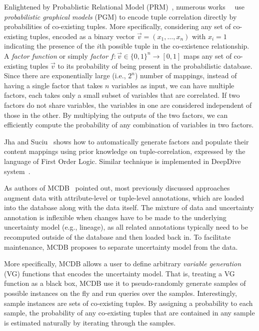 Enlightened by Probablistic Relational Model (PRM)~\cite{friedman1999learning}, numerous works~~\cite{sen2007representing, sen2009prdb} use \emph{probabilistic graphical models} (PGM) to encode tuple correlation directly by probabilities of co-existing tuples.
More specifically, considering any set of co-existing tuples, encoded as a binary vector $\vec v=(x_1,\ldots,x_n)$ with $x_i=1$ indicating the presence of the $i$th possible tuple in the co-existence relationship.
A \emph{factor function} or simply \emph{factor} $f: \vec v\in\{0,1\}^n \to [0,1]$ maps any set of co-existing tuples $\vec v$ to its probability of being present in the probabilistic database. 
Since there are exponentially large (i.e., $2^n$) number of mappings, instead of having a single factor that takes $n$ variables as input, we can have multiple factors, each takes only a small subset of variables that are correlated.
If two factors do not share variables, the variables in one are considered independent of those in the other.
By multiplying the outputs of the two factors, we can efficiently compute the probability of any combination of variables in two factors. 

Jha and Suciu~\cite{jha2012probabilistic} shows how to automatically generate factors and populate their content mappings using prior knowledge on tuple-correlation, expressed by the language of First Order Logic.
Similar technique is implemented in DeepDive system~\cite{shin2015incremental}.

As authors of MCDB~\cite{jampani2008mcdb} pointed out, most previously discussed approaches augment data with attribute-level or tuple-level annotations, which are loaded into the database along with the data itself.
The mixture of data and uncertainty annotation is inflexible when changes have to be made to the underlying uncertainty model (e.g., lineage), as all related annotations typically need to be recomputed outside of the database and then loaded back in.
To facilitate maintenance, MCDB proposes to separate uncertainty model from the data.

More specifically, MCDB allows a user to define arbitrary \emph{variable generation} (VG) functions that encodes the uncertainty model.
That is, treating a VG function as a black box, MCDB use it to pseudo-randomly generate samples of possible instances on the fly and run queries over the samples.
Interestingly, sample instances are sets of co-existing tuples.
By assigning a probability to each sample, the probability of any co-existing tuples that are contained in any sample is estimated naturally by iterating through the samples. 